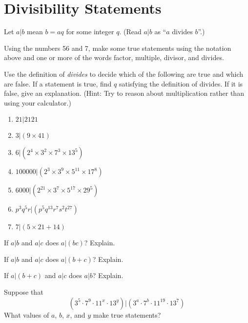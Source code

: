 \newpage
\section{Divisibility Statements}\label{A:divisibilityStatements}

Let $a|b$ mean $b=aq$ for some integer $q$.  (Read $a|b$ as ``$a$ divides $b$''.)  

\begin{prob}
Using the numbers 56 and 7, make some true statements using the notation above and one or more of the words factor, multiple, divisor, and divides.  
\end{prob}

\begin{prob}
Use the definition of \emph{divides} to decide which of the following are true and which are false.  If a statement is true, find $q$ satisfying the definition of divides.  If it is false, give an explanation.  (Hint:  Try to reason about multiplication rather than using your calculator.)
\begin{enumerate}
\item $21|2121$
\item $3|(9\times 41)$
\item $6|(2^4\times 3^2\times 7^3\times 13^5)$
\item $100000|(2^3\times 3^9\times 5^{11}\times 17^8)$
\item $6000|(2^{21}\times 3^7 \times 5^{17}\times 29^5)$
\item $p^3q^5r|(p^5q^{13}r^7s^2t^{27})$
\item $7|(5\times 21 + 14)$
\end{enumerate}
\end{prob}

\begin{prob}
If $a|b$ and $a|c$ does $a|(bc)$?  Explain. 
\end{prob}

\begin{prob}
If $a|b$ and $a|c$ does $a|(b+c)$?  Explain.  
\end{prob}

\begin{prob}
If $a|(b+c)$ and $a|c$ does $a|b$?  Explain.  
\end{prob}

\begin{prob}
Suppose that $$(3^5\cdot 7^9\cdot 11^x\cdot 13^y)|(3^a\cdot 7^b\cdot 11^{19}\cdot 13^7)$$
What values of $a$, $b$, $x$, and $y$ make true statements? 
\end{prob}
